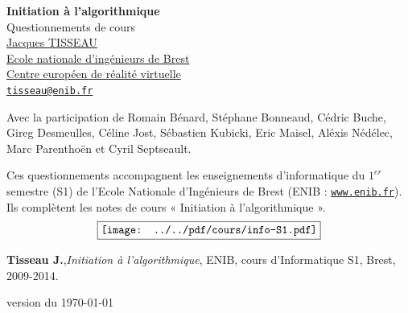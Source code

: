 \documentclass[11pt,a4paper,colorlinks,breaklinks]{article}
\renewcommand{\headrulewidth}{0pt}
\renewcommand{\footrulewidth}{0pt}
\begin{document}

\begin{titlepage}

\thispagestyle{fancy}
\setlength{\headheight}{79pt}
\setlength{\footskip}{20pt}
\renewcommand{\headrulewidth}{0pt}
\renewcommand{\footrulewidth}{0pt}

\begin{center}
{\huge\bf Initiation à l'algorithmique}\\[5mm]
{\huge\sc Questionnements de cours}\\[1cm]
\href{http://www.enib.fr/~tisseau}{\Large\sc Jacques TISSEAU}\\[3mm]
\href{http://www.enib.fr}{Ecole nationale d'ingénieurs de Brest}\\
\href{http://www.cerv.fr}{Centre européen de réalité virtuelle}\\
\href{mailto:tisseau@enib.fr}{\tt tisseau@enib.fr}
\end{center}
\vspace*{1cm}

{\footnotesize\vspace*{1.5mm}
\noindent Avec la participation de 
{\sc Romain Bénard}, 
{\sc Stéphane Bonneaud}, {\sc Cédric Buche},
{\sc Gireg Desmeulles}, {\sc Céline Jost}, 
{\sc Sébastien Kubicki}, {\sc Eric Maisel}, 
{\sc Aléxis Nédélec}, {\sc Marc Parenthoën} et 
{\sc Cyril Septseault}.
}
\null\vfill

\noindent Ces questionnements accompagnent les enseignements d'informatique 
du $1^{er}$ semestre (S1) de l'Ecole Nationale d'Ingénieurs 
de Brest (ENIB : \href{http://www.enib.fr}{\tt www.enib.fr}).
Ils complètent les notes de cours « Initiation à l'algorithmique ».
$$\fbox{\texttt{[image: ../../pdf/cours/info-S1.pdf]}}$$
\centerline{\footnotesize
{\bf Tisseau J.},{\em Initiation à l'algorithmique}, ENIB, cours d'Informatique S1, Brest, 2009-2014.
}
\null\vfill

\centerline{\tiny version du \today}

\end{titlepage}
\end{document}
